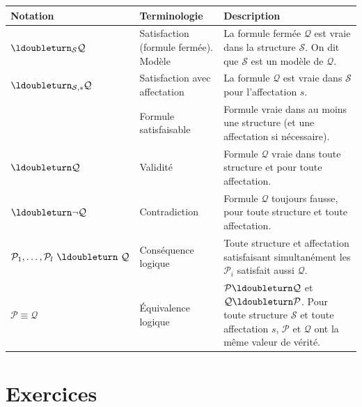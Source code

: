 \documentclass[11pt,class=report,crop=false]{standalone}
\begin{document}
\begin{center}
	\renewcommand{\arraystretch}{1.4}
	\begin{tabular}{p{4.5cm}p{4cm}p{6.5cm}}

		\textbf{Notation} & \textbf{Terminologie} & \textbf{Description} \\ \hline
		
		$\ldoubleturn_{\mathcal{S}} \mathcal{Q}$ 
		& Satisfaction (formule fermée). Modèle
		& La formule fermée $\mathcal{Q}$ est vraie dans la structure $\mathcal{S}$. On dit que $\mathcal{S}$ est un modèle de $\mathcal{Q}$. \\ \hline
		
		$\ldoubleturn_{\mathcal{S},s} \mathcal{Q}$ 
		& Satisfaction avec affectation 
		& La formule $\mathcal{Q}$ est vraie dans $\mathcal{S}$ pour l'affectation $s$. \\ \hline
		
		
		& Formule satisfaisable 
		& Formule vraie dans au moins une structure (et une affectation si nécessaire). \\ \hline
		
		$\ldoubleturn \mathcal{Q}$ 
		& Validité 
		& Formule $\mathcal{Q}$ vraie dans toute structure et pour toute affectation. \\ \hline
		
		$\ldoubleturn \lnot \mathcal{Q}$ 
		& Contradiction 
		& Formule $\mathcal{Q}$ toujours fausse, pour toute structure et toute affectation. \\ \hline
		
		$\mathcal{P}_1,\ldots,\mathcal{P}_l \ \ldoubleturn \ \mathcal{Q}$ 
		& Conséquence logique 
		& Toute structure et affectation satisfaisant simultanément les $\mathcal{P}_i$ satisfait aussi $\mathcal{Q}$. \\ \hline
		
		$\mathcal{P} \equiv \mathcal{Q}$ 
		& Équivalence logique 
		& $\mathcal{P} \ldoubleturn \mathcal{Q}$ et $\mathcal{Q} \ldoubleturn \mathcal{P}$.
		Pour toute structure $\mathcal{S}$ et toute affectation $s$, 
		$\mathcal{P}$ et $\mathcal{Q}$ ont la même valeur de vérité.  \\ 
		
	\end{tabular}
\end{center}



\section*{Exercices}
\end{document}
